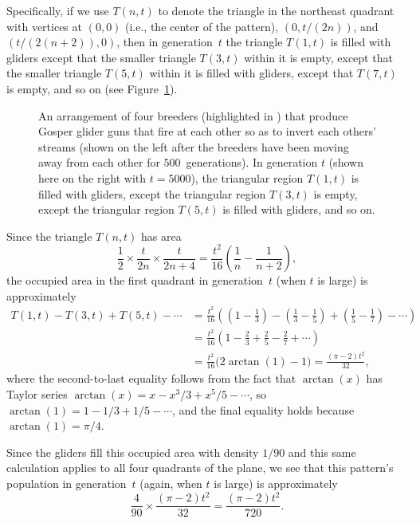 \begin{itemize}
	Specifically, if we use $T(n,t)$ to denote the triangle in the northeast quadrant with vertices at $(0,0)$ (i.e., the center of the pattern), $(0, t/(2n))$, and $(t/(2(n+2)), 0)$, then in generation~$t$ the triangle $T(1,t)$ is filled with gliders except that the smaller triangle $T(3,t)$ within it is empty, except that the smaller triangle $T(5,t)$ within it is filled with gliders, except that $T(7,t)$ is empty, and so on (see Figure~\ref{fig:life_computes_pi}).\bigskip
	
	\begin{figure}[!htb]
		\centering
		\caption{An arrangement of four breeders (highlighted in ) that produce Gosper glider guns that fire at each other so as to invert each others' streams (shown on the left after the breeders have been moving away from each other for $500$~generations). In generation $t$ (shown here on the right with $t = 5000$), the  triangular region $T(1,t)$ is filled with gliders, except the  triangular region $T(3,t)$ is empty, except the  triangular region $T(5,t)$ is filled with gliders, and so on.}\label{fig:life_computes_pi}
	\end{figure}
	
	Since the triangle $T(n,t)$ has area
	\[
	\frac{1}{2} \times \frac{t}{2n} \times \frac{t}{2n+4} = \frac{t^2}{16} \left(\frac{1}{n} - \frac{1}{n+2}\right),
	\]
	the occupied area in the first quadrant in generation~$t$ (when $t$ is large) is approximately
	\begin{align*}
		T(1,t) - T(3,t) + T(5,t) - \cdots & = \frac{t^2}{16} \left( \left(1 - \frac{1}{3}\right) - \left(\frac{1}{3} - \frac{1}{5}\right) + \left(\frac{1}{5} - \frac{1}{7}\right) - \cdots\right) \\
		& = \frac{t^2}{16} \left( 1 - \frac{2}{3} + \frac{2}{5} - \frac{2}{7} + \cdots\right) \\
		& = \frac{t^2}{16}\big( 2\arctan(1) - 1\big) = \frac{(\pi-2)t^2}{32},
	\end{align*}
	where the second-to-last equality follows from the fact that $\arctan(x)$ has Taylor series $\arctan(x) = x - x^3/3 + x^5/5 - \cdots$, so $\arctan(1) = 1 - 1/3 + 1/5 - \cdots$, and the final equality holds because $\arctan(1) = \pi/4$.
	
	Since the gliders fill this occupied area with density $1/90$ and this same calculation applies to all four quadrants of the plane, we see that this pattern's population in generation~$t$ (again, when $t$ is large) is approximately
	\[
	\frac{4}{90} \times \frac{(\pi-2)t^2}{32} = \frac{(\pi-2)t^2}{720}.
	\]
\end{itemize}


